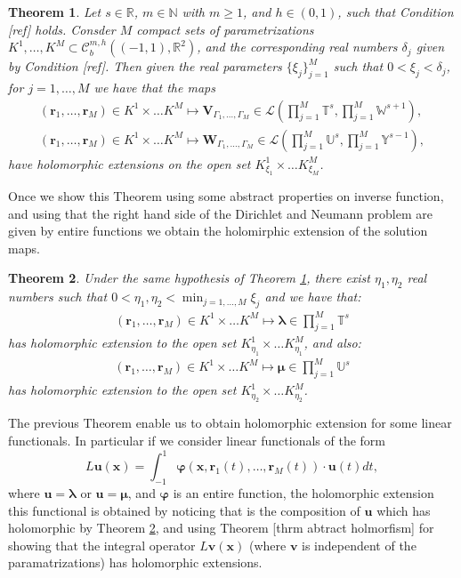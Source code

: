 \documentclass{article}
\newtheorem{theorem}{Theorem}[section]
\newcommand{\todo}[1]{{\color{red}[#1]}}
\newcommand{\bmu} {\bm{\mu}}
\newcommand{\IN}{{\mathbb N}}
\newcommand{\IR}{{\mathbb R}}
\newcommand{\IU}{{\mathbb U}}
\newcommand{\IT}{{\mathbb T}}
\newcommand{\IW}{{\mathbb W}}
\newcommand{\IY}{{\mathbb Y}}
\newcommand{\rgeoh}[2]{\mathcal{C}_b^{#1,#2}\left( (-1,1), \IR^2 \right)}
\newcommand{\bla}{\boldsymbol \lambda}
\newcommand{\bu}{\bm{u}}
\newcommand{\bv}{\bm{v}}
\newcommand{\br}{\bm{r}}
\newcommand{\bx}{\bm{x}}
\begin{document}
\begin{theorem}
\label{thrm:biohlmextension}
Let $s \in \IR$, $m \in \IN$ with $m \geq 1$, and $h \in (0,1)$, such that Condition \todo{ref} holds. Consder $M$ compact sets of parametrizations $K^1,\hdots,K^M \subset \rgeoh{m}{h}$, and the corresponding real numbers $\delta_j$ given by Condition  \todo{ref}. Then given the real parameters $\{\xi_j\}_{j=1}^M$ such that $0 < \xi_j < \delta_j$, for $j=1,\hdots,M$ we have that the maps 
\begin{align*}
(\br_1,\hdots,\br_M) \in K^1 \times \hdots K^M \mapsto \mathbf{V}_{\Gamma_1, \hdots,\Gamma_M} \in \mathcal{L} \left(  \prod_{j=1}^M \IT^s, \prod_{j=1}^M \IW^{s+1}
\right)
,\\
(\br_1,\hdots,\br_M) \in K^1 \times \hdots K^M \mapsto \mathbf{W}_{\Gamma_1, \hdots,\Gamma_M} \in \mathcal{L} \left(  \prod_{j=1}^M \IU^s, \prod_{j=1}^M \IY^{s-1}
\right)
,
\end{align*}
have holomorphic extensions on the open set $K^1_{\xi_1}\times\hdots K^M_{\xi_M}$.
\end{theorem}
Once we show this Theorem using some abstract properties on inverse function, and using that the right hand side of the Dirichlet and Neumann problem are given by entire functions we obtain the holomirphic extension of the solution maps. 
\begin{theorem}
\label{thrm:solutionholomrext}
Under the same hypothesis of Theorem \ref{thrm:biohlmextension}, there exist $\eta_1,\eta_2$ real numbers such that
$0<\eta_1,\eta_2< \min_{j=1,\hdots,M}\xi_j$ and we have that: 
\begin{align*}
(\br_1,\hdots,\br_M) \in K^1 \times \hdots K^M \mapsto  \bla \in \prod_{j=1}^M \IT^s
\end{align*}
has holomorphic extension to the open set $K_{\eta_1}^1 \times \hdots K_{\eta_1}^M$, and also: 
\begin{align*}
(\br_1,\hdots,\br_M) \in K^1 \times \hdots K^M \mapsto  \bmu \in \prod_{j=1}^M \IU^s
\end{align*}
has holomorphic extension to the open set $K_{\eta_2}^1 \times \hdots K_{\eta_2}^M$.
\end{theorem}
The previous Theorem enable us to obtain holomorphic extension for some linear functionals. In particular if we consider linear functionals of the form  $$L\bu (\bx) = \int_{-1}^{1} \mathbf{\varphi}(\bx,\br_1(t),\hdots,\br_M(t)) \cdot \bu(t) dt,$$ where $\bu = \bla $ or $\bu = \bmu$, and $\mathbf{\varphi}$ is an entire function, the holomorphic extension this functional is obtained by noticing that is the composition of $\bu$ which has holomorphic by Theorem \ref{thrm:solutionholomrext}, and using Theorem \todo{thrm abtract holmorfism} for showing that the integral operator 
$L\bv(\bx)$ (where $\bv$ is independent of the paramatrizations) has holomorphic extensions. 
\end{document}
